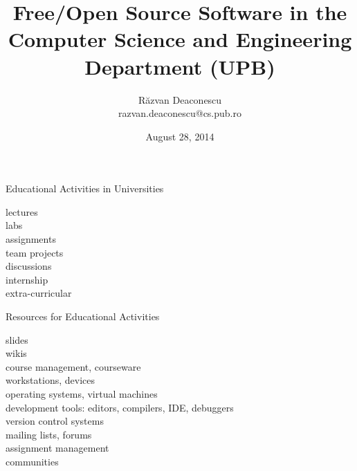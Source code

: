 \documentclass{paper}
\title[FOSS @CSE]{Free/Open Source Software in the Computer Science and
Engineering Department (UPB)}
\date{August 28, 2014}
\author[Răzvan Deaconescu]{Răzvan Deaconescu\\
razvan.deaconescu@cs.pub.ro}
\begin{document}
\frame{\titlepage}

\begin{frame}{Educational Activities in Universities}
  \begin{center}
    {\Large
      \pause lectures \\
      \pause labs \\
      \pause assignments \\
      \pause team projects \\
      \pause discussions \\
      \pause internship \\
      \pause extra-curricular
    }
  \end{center}
\end{frame}

\begin{frame}{Resources for Educational Activities}
  \begin{center}
    {\Large
      \pause slides \\
      \pause wikis \\
      \pause course management, courseware \\
      \pause workstations, devices \\
      \pause operating systems, virtual machines \\
      \pause development tools: editors, compilers, IDE, debuggers \\
      \pause version control systems \\
      \pause mailing lists, forums \\
      \pause assignment management \\
      \pause communities
    }
  \end{center}
\end{frame}
\end{document}
